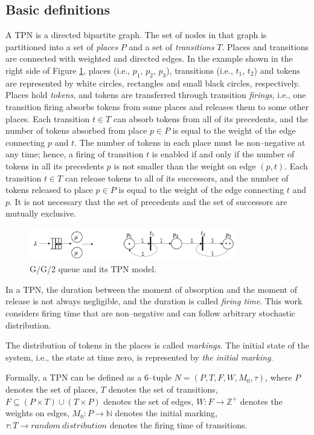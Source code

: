 \documentclass[suppldata]{interact}
\theoremstyle{plain}
\theoremstyle{definition}
\theoremstyle{remark}
\begin{document}
\subsection{Basic definitions}
A TPN is a directed bipartite graph. The set of nodes in that graph is partitioned into a set of \textit{places} $P$ and a set of \textit{transitions} $T$. Places and transitions are connected with weighted and directed edges. In the example shown in the right side of Figure \ref{fig:gg1_petri}, places (i.e., $p_1$, $p_2$, $p_3$), transitions (i.e., $t_1$, $t_2$) and tokens are represented by white circles, rectangles and small black circles, respectively. Places hold \textit{tokens}, and tokens are transferred through transition \textit{firings}, i.e., one transition firing absorbs tokens from some places and releases them to some other places. Each transition $t\in{T}$ can absorb tokens from all of its precedents, and the number of tokens absorbed from place $p\in P$ is equal to the weight of the edge connecting $p$ and $t$. The number of tokens in each place must be non--negative at any time; hence, a firing of transition $t$ is enabled if and only if the number of tokens in all its precedents $p$ is not smaller than the weight on edge $(p,t)$. Each transition $t\in{T}$ can release tokens to all of its successors, and the number of tokens released to place $p\in P$ is equal to the weight of the edge connecting $t$ and $p$.  It is not necessary that the set of precedents and the set of successors are mutually exclusive. 
\begin{figure}[h]
	\centering
	\includegraphics[width=0.8\textwidth]{Figures/GG1_petri.png}
	\caption{G/G/2 queue and its TPN model.}
	\label{fig:gg1_petri}
\end{figure}
In a TPN, the duration between the moment of absorption and the moment of release is not always negligible, and the duration is called \textit{firing time}. This work considers firing time %
that are non--negative and can follow arbitrary stochastic distribution. 

The distribution of tokens in the places is called \textit{markings}. The initial state of the system, i.e., the state at time zero, is represented by \textit{the initial marking}. 

Formally, a TPN can be defined as a 6--tuple $N=(P, T, F,W, M_0, \tau)$, where ${P}$ denotes the set of places, ${T}$ denotes the set of transitions, ${F}\subseteq(P\times T)\cup(T\times P)$ denotes the set of edges, $W:F \rightarrow \mathbb{Z}^{+}$ denotes the weights on edges, $M_0:P\rightarrow \mathbb{N}$ denotes the initial marking,
	$\tau:T\rightarrow random\ distribution$ denotes the firing time of transitions.
\end{document}
